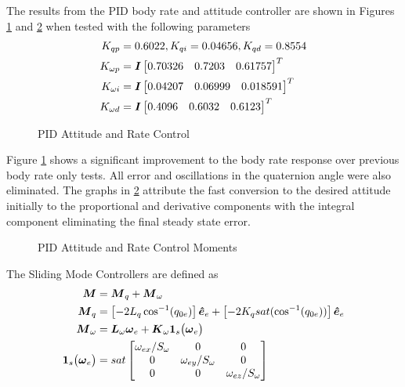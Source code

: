 The results from the PID body rate and attitude controller are shown in Figures \ref{fig:PIDAttitudeAndRateControl} and \ref{fig:PIDAttitudeAndRateControlMoments} when tested with the following parameters
\begin{equation}
  \begin{aligned}
    K_{qp} &= 0.6022,K_{qi} = 0.04656,K_{qd} = 0.8554 \\
    K_{\omega p} &= \boldsymbol{I} \begin{bmatrix} 0.70326 & 0.7203 & 0.61757 \end{bmatrix}^T \\
    K_{\omega i} &= \boldsymbol{I} \begin{bmatrix} 0.04207 & 0.06999 & 0.018591 \end{bmatrix}^T \\
    K_{\omega d} &= \boldsymbol{I} \begin{bmatrix} 0.4096 & 0.6032 & 0.6123 \end{bmatrix}^T
  \end{aligned}
\end{equation}
\begin{figure}[H]
  \centerline{}
  \caption{PID Attitude and Rate Control}
  \label{fig:PIDAttitudeAndRateControl}
\end{figure}
Figure \ref{fig:PIDAttitudeAndRateControl} shows a significant improvement to the body rate response over previous body rate only tests.  All error and oscillations in the quaternion angle were also eliminated.  The graphs in \ref{fig:PIDAttitudeAndRateControlMoments} attribute the fast conversion to the desired attitude initially to the proportional and derivative components with the integral component eliminating the final steady state error.
\begin{figure}[H]
  \centerline{}
  \caption{PID Attitude and Rate Control Moments}
  \label{fig:PIDAttitudeAndRateControlMoments}
\end{figure}

The Sliding Mode Controllers are defined as
\begin{equation}
  \begin{aligned}
    \boldsymbol{M} &= \boldsymbol{M}_{q} + \boldsymbol{M}_{\omega} \\
    \boldsymbol{M}_{q} &= \left[-2 L_{q} \cos^{-1} (q_{0e}) \right] \boldsymbol{\hat{e}}_e + \left[-2 K_{q} sat (\cos^{-1} (q_{0e})) \right] \boldsymbol{\hat{e}}_e \\
    \boldsymbol{M}_{\omega} &= \boldsymbol{L}_{\omega} \boldsymbol{\omega}_e + \boldsymbol{K}_{\omega}\boldsymbol{1}_s \big(\boldsymbol{\omega}_e \big) \\
    \boldsymbol{1}_s \big(\boldsymbol{\omega}_e \big) &= sat \begin{bmatrix} \omega_{ex} / S_{\omega} &0 &0 \\ 0 & \omega_{ey} / S_{\omega} & 0 \\ 0 & 0 & \omega_{ez} / S_{\omega} \end{bmatrix}
  \end{aligned}
\end{equation}

